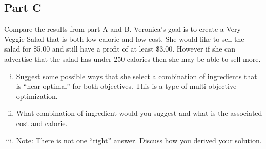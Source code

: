 \documentclass[../main.tex]{subfiles}
\begin{document}
\subsection*{Part C}
Compare the results from part A and B. Veronica’s goal is to create a Very Veggie Salad that is both low calorie and low cost. She would like to sell the salad for \$5.00 and still have a profit of at least \$3.00. However if she can advertise that the salad has under 250 calories then she may be able to sell more.

\begin{enumerate}[i.]
	\item Suggest some possible ways that she select a combination of ingredients that is “near optimal” for both objectives. This is a type of multi-objective optimization.

	\item What combination of ingredient would you suggest and what is the associated cost and calorie.

	\item Note: There is not one “right” answer. Discuss how you derived your solution.
\end{enumerate}
\end{document}
